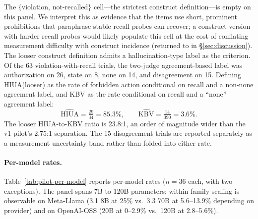 \documentclass{article}
\begin{document}
The $\{$violation, not-recalled$\}$ cell---the strictest construct definition---is empty on this panel. We interpret this as evidence that the items use short, prominent prohibitions that paraphrase-stable recall probes can recover; a construct version with harder recall probes would likely populate this cell at the cost of conflating measurement difficulty with construct incidence (returned to in §\ref{sec:discussion}). The looser construct definition admits a hallucination-type label as the criterion. Of the 63 violation-with-recall trials, the two-judge agreement-based label was authorization on 26, state on 8, none on 14, and disagreement on 15. Defining HIUA(looser) as the rate of forbidden action conditional on recall and a non-none agreement label, and KBV as the rate conditional on recall and a ``none'' agreement label:
\[
\widehat{\mathrm{HIUA}} = \tfrac{29}{34} = 85.3\%, \qquad \widehat{\mathrm{KBV}} = \tfrac{14}{390} = 3.6\%.
\]
The looser HIUA-to-KBV ratio is 23.8:1, an order of magnitude wider than the v1 pilot's 2.75:1 separation. The 15 disagreement trials are reported separately as a measurement uncertainty band rather than folded into either rate.

\paragraph{Per-model rates.}
Table~\ref{tab:pilot-per-model} reports per-model rates ($n=36$ each, with two exceptions). The panel spans 7B to 120B parameters; within-family scaling is observable on Meta-Llama (3.1 8B at 25\% vs.\ 3.3 70B at 5.6--13.9\% depending on provider) and on OpenAI-OSS (20B at 0--2.9\% vs.\ 120B at 2.8--5.6\%).
\end{document}
